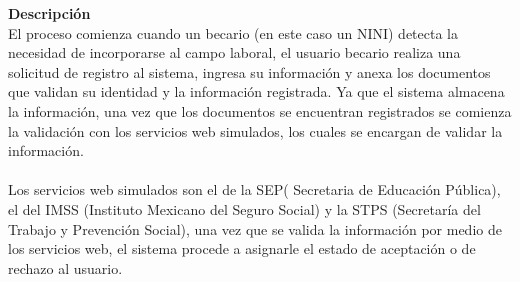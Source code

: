 \textbf{Descripción} \\

El proceso comienza cuando un becario (en este caso un NINI) detecta la necesidad de incorporarse al campo laboral, el usuario becario realiza una solicitud de registro al sistema, ingresa su información y anexa los documentos que validan su identidad y la información registrada. Ya que el sistema almacena la información, una vez que los documentos se encuentran registrados se comienza la validación con los servicios web simulados, los cuales se encargan de validar la información.\\
\\Los servicios web simulados son el de la SEP( Secretaria de Educación Pública), el del IMSS (Instituto Mexicano del Seguro Social) y la STPS (Secretaría del Trabajo y Prevención Social), una vez que se valida la información por medio de los servicios web, el sistema procede a asignarle el estado de aceptación o de rechazo al usuario. %
\\











